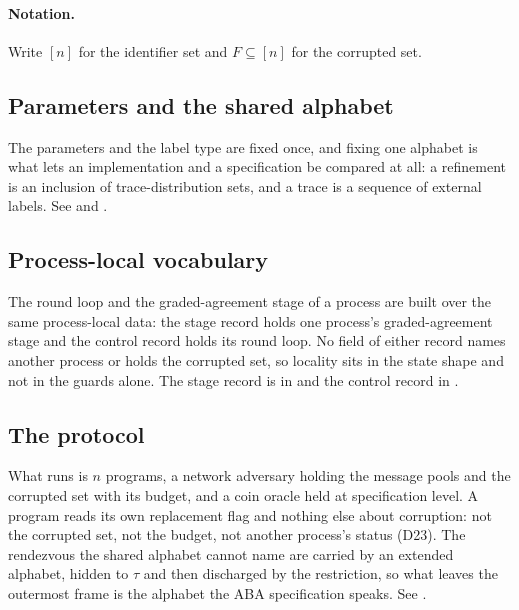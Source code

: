 \paragraph{Notation.}
Write $[n]$ for the identifier set and $F \subseteq [n]$ for the corrupted set.

\subsection{Parameters and the shared alphabet}

The parameters and the label type are fixed once, and fixing one alphabet is what lets an implementation and a specification be compared at all: a refinement is an inclusion of trace-distribution sets, and a trace is a sequence of external labels.
See  and .




\subsection{Process-local vocabulary}

The round loop and the graded-agreement stage of a process are built over the same process-local data: the stage record holds one process's graded-agreement stage and the control record holds its round loop.
No field of either record names another process or holds the corrupted set, so locality sits in the state shape and not in the guards alone.
The stage record is in  and the control record in .




\subsection{The protocol}

What runs is $n$ programs, a network adversary holding the message pools and the corrupted set with its budget, and a coin oracle held at specification level.
A program reads its own replacement flag and nothing else about corruption: not the corrupted set, not the budget, not another process's status (D23).
The rendezvous the shared alphabet cannot name are carried by an extended alphabet, hidden to $\tau$ and then discharged by the restriction, so what leaves the outermost frame is the alphabet the ABA specification speaks.
See .

